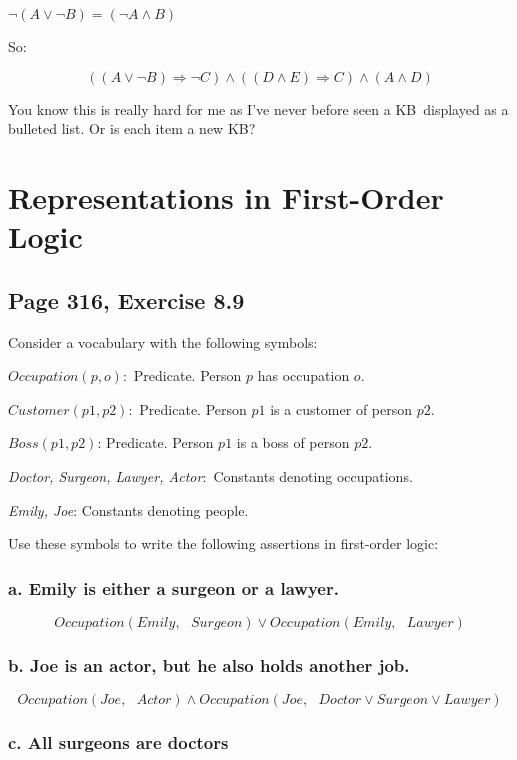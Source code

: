 \documentclass{article}
\begin{document}
$\lnot \left( A\vee \lnot B\right) =\left( \lnot A\wedge B\right) $

So:

\[
\left( \left( A\vee \lnot B\right) \Rightarrow \lnot C\right) \wedge \left(
\left( D\wedge E\right) \Rightarrow C\right) \wedge \left( A\wedge D\right) 
\]

You know this is really hard for me as I've never before seen a KB\
displayed as a bulleted list. Or is each item a new KB?

\section{Representations in First-Order Logic}

\subsection{Page 316, Exercise 8.9}

Consider a vocabulary with the following symbols:

$Occupation(p,o)$:\ Predicate. Person $p$ has occupation $o$.

$Customer\left( p1,p2\right) $:\ Predicate. Person $p1$ is a customer of
person $p2$.

$Boss\left( p1,p2\right) $: Predicate. Person $p1$ is a boss of person $p2$.

\textit{Doctor, Surgeon, Lawyer, Actor}:\textit{\ }Constants denoting
occupations.

\textit{Emily, Joe}: Constants denoting people.

Use these symbols to write the following assertions in first-order logic:

\subsubsection{a. Emily is either a surgeon or a lawyer.}

\[
Occupation(Emily,\text{ }Surgeon)\vee Occupation(Emily,\text{ }Lawyer) 
\]

\subsubsection{b. Joe is an actor, but he also holds another job.}

\[
Occupation(Joe,\text{ }Actor)\wedge Occupation(Joe,\text{ }Doctor\vee
Surgeon\vee Lawyer) 
\]

\subsubsection{c. All surgeons are doctors}
\end{document}
